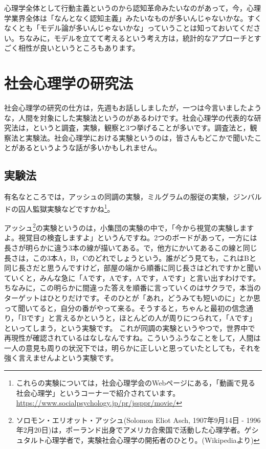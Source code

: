 \documentclass{ltjsbook}
\begin{document}
心理学全体として行動主義というのから認知革命みたいなのがあって，今，心理学業界全体は「なんとなく認知主義」みたいなものが多いんじゃないかな。すくなくとも「モデル論が多いんじゃないかな」っていうことは知っておいてください。ちなみに，モデルを立てて考えるという考え方は，統計的なアプローチとすごく相性が良いというところもあります。

\section{社会心理学の研究法}
社会心理学の研究の仕方は，先週もお話ししましたが，一つは今言いましたような，人間を対象にした実験法というのがあるわけです。社会心理学の代表的な研究法は，というと調査，実験，観察と3つ挙げることが多いです。調査法と，観察法と実験法。社会心理学における実験というのは，皆さんもどこかで聞いたことがあるというような話が多いかもしれません。
\subsection{実験法}
有名なところでは，アッシュの同調の実験，ミルグラムの服従の実験，ジンバルドの囚人監獄実験などですかね\footnote{これらの実験については，社会心理学会のWebページにある，「動画で見る社会心理学」というコーナーで紹介されています。\url{https://www.socialpsychology.jp/pr/jssppr/movie/}}。

アッシュ\footnote{ソロモン・エリオット・アッシュ(Solomon Eliot Asch, 1907年9月14日 - 1996年2月20日)は，ポーランド出身でアメリカ合衆国で活動した心理学者。ゲシュタルト心理学者で，実験社会心理学の開拓者のひとり。(Wikipediaより)}の実験というのは，小集団の実験の中で，「今から視覚の実験しますよ。視覚目の検査しますよ」というんですね。2つのボードがあって，一方には長さが明らかに違う3本の線が描いてある。で，他方にかいてあるこの線と同じ長さは，この3本A，B，Cのどれでしょうという。誰がどう見ても，これはBと同じ長さだと思うんですけど，部屋の端から順番に同じ長さはどれですかと聞いていくと，みんな急に「Aです，Aです，Aです，Aです」と言い出すわけです。ちなみに，この明らかに間違った答えを順番に言っていくのはサクラで，本当のターゲットはひとりだけです。そのひとが「あれ，どうみても短いのに」とか思って聞いてると，自分の番がやって来る。そうすると，ちゃんと最初の信念通り，「Bです」と言えるかというと，ほとんどの人が周りにつられて，「Aです」といってしまう，という実験です。
これが同調の実験というやつで，世界中で再現性が確認されているはなしなんですね。こういうふうなことをして，人間は一人の意見も周りの状況下では，明らかに正しいと思っていたとしても，それを強く言えませんよという実験です。
\end{document}
